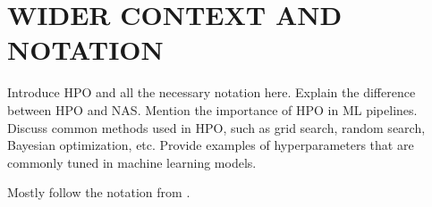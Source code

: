 \section{\uppercase{Wider context and Notation}}


Introduce HPO and all the necessary notation here. Explain the difference between HPO and NAS\@. Mention the importance of HPO in ML pipelines. Discuss common methods used in HPO, such as grid search, random search, Bayesian optimization, etc. Provide examples of hyperparameters that are commonly tuned in machine learning models.

Mostly follow the notation from \cite{bischl_hyperparameter_2023}.
